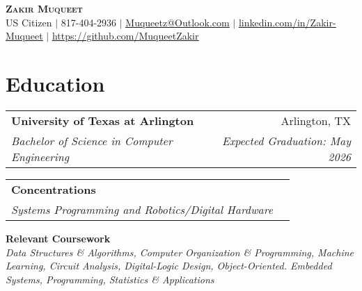 \documentclass[letterpaper,11pt]{article}
\makeatletter
\newcommand{\resumeSubheading}[4]{
  \vspace{-2pt}\item
    \begin{tabular*}{0.97\textwidth}[t]{l@{\extracolsep{\fill}}r}
      \textbf{#1} & #2 \\
      \textit{\small#3} & \textit{\small #4} \\
    \end{tabular*}\vspace{-7pt}
}
\newcommand{\resumeSubHeadingListStart}{\begin{itemize}[leftmargin=0.15in, label={}]}
\newcommand{\resumeSubHeadingListEnd}{\end{itemize}}
\makeatother
\begin{document}

\begin{center}
    \textbf{\Huge \scshape Zakir Muqueet} \\ \vspace{1pt}
  \small US Citizen $|$ \small 817-404-2936 $|$ \href{mailto:x@x.com}{\underline{Muqueetz@Outlook.com}} $|$ 
    \href{https://linkedin.com/in/...}{\underline{linkedin.com/in/Zakir-Muqueet}} $|$
    \href{https://github.com/...}{\underline{https://github.com/MuqueetZakir}}
\end{center}
\section{Education}
  \resumeSubHeadingListStart
    \resumeSubheading
      {University of Texas at Arlington}{Arlington, TX}
      {Bachelor of Science in Computer Engineering}{\textit{Expected Graduation: May 2026}}
    
    \resumeSubheading
      {Concentrations}{}{Systems Programming and Robotics/Digital Hardware}{}
     \small{\item{
      \textbf{Relevant Coursework}\\ \textit{Data Structures \& Algorithms, Computer Organization \& Programming, Machine Learning, Circuit Analysis, Digital-Logic Design, Object-Oriented. Embedded Systems, Programming, Statistics \& Applications}}
}
  \resumeSubHeadingListEnd
\end{document}
